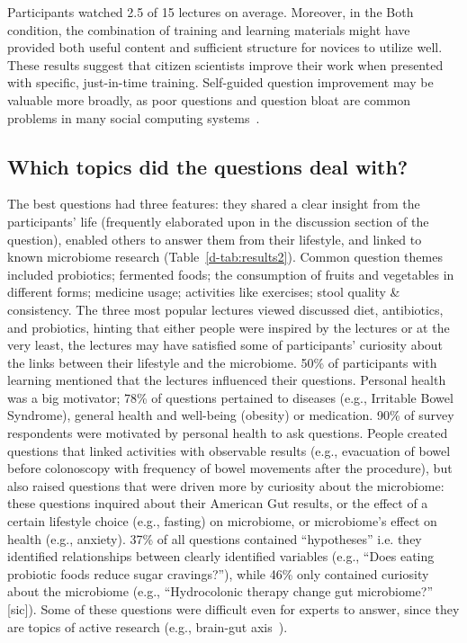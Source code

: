 Participants watched 2.5 of 15 lectures on average. Moreover, in the Both condition, the combination of training and learning materials might have provided both useful content and sufficient structure for novices to utilize well. These results suggest that citizen scientists improve their work when presented with specific, just-in-time training. Self-guided question improvement may be valuable more broadly, as poor questions and question bloat are common problems in many social computing systems~\cite{Yang:2014:ARQ:2631775.2631809}.

\subsection{Which topics did the questions deal with?}
The best questions had three features: they shared a clear insight from the participants’ life (frequently elaborated upon in the discussion section of the question), enabled others to answer them from their lifestyle, and linked to known microbiome research (Table~\ref{d-tab:results2}). Common question themes included probiotics; fermented foods; the consumption of fruits and vegetables in different forms; medicine usage; activities like exercises; stool quality \& consistency. The three most popular lectures viewed discussed diet, antibiotics, and probiotics, hinting that either people were inspired by the lectures or at the very least, the lectures may have satisfied some of participants’ curiosity about the links between their lifestyle and the microbiome. 50\% of participants with learning mentioned that the lectures influenced their questions.
Personal health was a big motivator; 78\% of questions pertained to diseases (e.g., Irritable Bowel Syndrome), general health and well-being (obesity) or medication. 90\% of survey respondents were motivated by personal health to ask questions. People created questions that linked activities with observable results (e.g., evacuation of bowel before colonoscopy with frequency of bowel movements after the procedure), but also raised questions that were driven more by curiosity about the microbiome: these questions inquired about their American Gut results, or the effect of a certain lifestyle choice (e.g., fasting) on microbiome, or microbiome’s effect on health (e.g., anxiety). 37\% of all questions contained “hypotheses” i.e. they identified relationships between clearly identified variables (e.g., “Does eating probiotic foods reduce sugar cravings?”), while 46\% only contained curiosity about the microbiome (e.g., “Hydrocolonic therapy change gut microbiome?” [sic]). Some of these questions were difficult even for experts to answer, since they are topics of active research (e.g., brain-gut axis~\cite{Mayer15490}).


